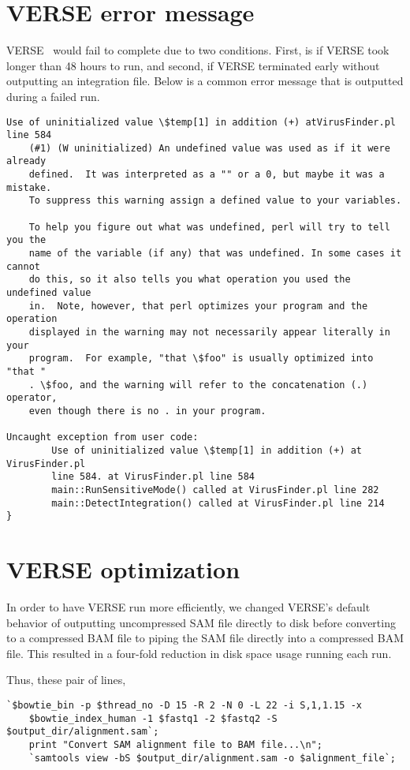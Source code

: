 \documentclass[12pt]{article}
\begin{document}
\section{VERSE error message}\label{verse_error}
VERSE~\cite{Wang2015} would fail to complete due to two conditions.  First, is if VERSE took longer than 48 hours to run, and second, if VERSE terminated early without outputting an integration file.  Below is a common error message that
is outputted during a failed run.  
\begin{lstlisting}[basicstyle=\footnotesize]
Use of uninitialized value \$temp[1] in addition (+) atVirusFinder.pl line 584 
    (#1) (W uninitialized) An undefined value was used as if it were already
    defined.  It was interpreted as a "" or a 0, but maybe it was a mistake.
    To suppress this warning assign a defined value to your variables.

    To help you figure out what was undefined, perl will try to tell you the
    name of the variable (if any) that was undefined. In some cases it cannot
    do this, so it also tells you what operation you used the undefined value
    in.  Note, however, that perl optimizes your program and the operation
    displayed in the warning may not necessarily appear literally in your
    program.  For example, "that \$foo" is usually optimized into "that "
    . \$foo, and the warning will refer to the concatenation (.) operator,
    even though there is no . in your program.

Uncaught exception from user code:
        Use of uninitialized value \$temp[1] in addition (+) at VirusFinder.pl 
        line 584. at VirusFinder.pl line 584
        main::RunSensitiveMode() called at VirusFinder.pl line 282
        main::DetectIntegration() called at VirusFinder.pl line 214
}
\end{lstlisting}


\section{VERSE optimization}\label{verse_opt}
In order to have VERSE run more efficiently, we changed VERSE's default behavior of outputting uncompressed SAM file directly to disk before converting to a compressed BAM file to piping the SAM file directly into a compressed BAM file.  This resulted in a four-fold reduction in disk space usage running each run.

Thus, these pair of lines,

\begin{lstlisting}[basicstyle=\footnotesize]
    `$bowtie_bin -p $thread_no -D 15 -R 2 -N 0 -L 22 -i S,1,1.15 -x 
    $bowtie_index_human -1 $fastq1 -2 $fastq2 -S $output_dir/alignment.sam`;
    print "Convert SAM alignment file to BAM file...\n";
    `samtools view -bS $output_dir/alignment.sam -o $alignment_file`;
\end{lstlisting}
    
\end{document}
